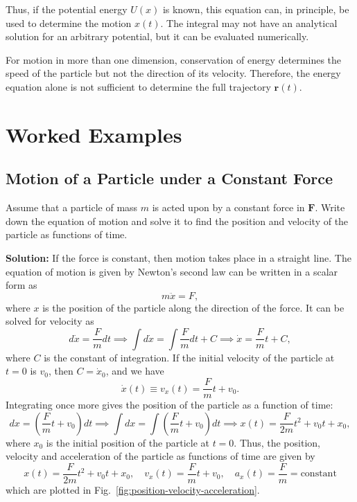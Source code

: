\documentclass[12pt]{article}
\begin{document}
Thus, if the potential energy $U(x)$ is known, this equation can, in principle, be used to determine the motion $x(t)$. The integral may not have an analytical solution for an arbitrary potential, but it can be evaluated numerically.

For motion in more than one dimension, conservation of energy determines the speed of the particle but not the direction of its velocity. Therefore, the energy equation alone is not sufficient to determine the full trajectory $\mathbf{r}(t)$.


\section{Worked Examples}

\subsection{\label{ex:constant-force} Motion of a Particle under a Constant Force}
Assume that a particle of mass $m$ is acted upon by a constant force in $\mathbf{F}$. Write down the equation of motion and solve it to find the position and velocity of the particle as functions of time.

\textbf{Solution:} If the force is constant, then motion takes place in a straight line. The equation of motion is given by Newton's second law can be written in a scalar form as
\begin{equation}
m\ddot{x} = F,
\end{equation}
where $x$ is the position of the particle along the direction of the force. It can be solved for velocity as
\begin{equation}
    d\dot{x} = \frac{F}{m}dt \implies \int d\dot{x} = \int \frac{F}{m}dt + C \implies \dot{x} = \frac{F}{m}t + C,
\end{equation}
where $C$ is the constant of integration. If the initial velocity of the particle at $t=0$ is $v_0$, then $C = \dot{x}_0$, and we have
\begin{equation}
    \dot{x}(t) \equiv v_x(t) = \frac{F}{m}t + v_0.
\end{equation}
Integrating once more gives the position of the particle as a function of time:
\begin{equation}
    dx = \left(\frac{F}{m}t + v_0\right)dt \implies \int dx = \int \left(\frac{F}{m}t + v_0\right)dt \implies x(t) = \frac{F}{2m}t^2 + v_0 t + x_0,
\end{equation}
where $x_0$ is the initial position of the particle at $t=0$. Thus, the position, velocity and acceleration of the particle as functions of time are given by 
\begin{equation}
    \boxed{
x(t) = \frac{F}{2m}t^2 + v_0 t + x_0, \quad v_x(t) = \frac{F}{m}t + v_0, \quad a_x(t) = \frac{F}{m}= \text{constant}
    }
    \label{eq:constant-force-motion}
\end{equation}
which are plotted in Fig.~\ref{fig:position-velocity-acceleration}.
\end{document}
